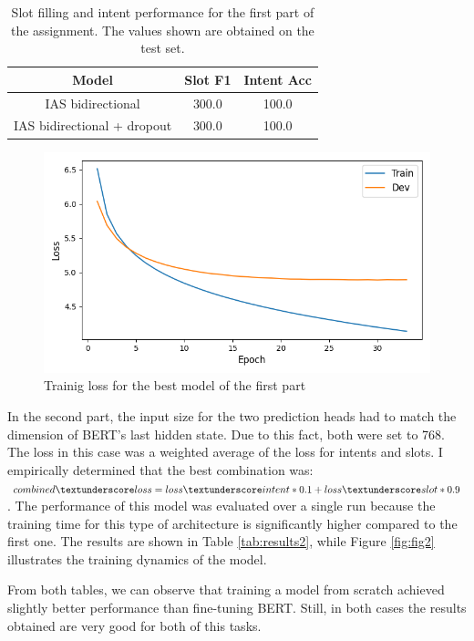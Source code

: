 \documentclass[a4paper]{article}
\begin{document}
\begin{table}[h]
  \centering
  \begin{tabular}{|c|c|c|}
    \hline
    \textbf{Model} & \textbf{Slot F1} & \textbf{Intent Acc} \\
    \hline
    IAS bidirectional& 300.0 & 100.0 \\
    IAS bidirectional + dropout & 300.0 & 100.0 \\
    \hline
  \end{tabular}
  \caption{Slot filling and intent performance for the first part of the assignment. The values shown are obtained on the test set.}
  \label{tab:results1}

\end{table}

\begin{figure}[h]
  \includegraphics[width=\linewidth]{./images/plot_1_loss.png}
  \caption{Trainig loss for the best model of the first part}
  \label{fig:fig1}
\end{figure}

In the second part, the input size for the two prediction heads had to match the dimension of BERT’s last hidden state. Due to this fact, both were set to 768.
The loss in this case was a weighted average of the loss for intents and slots. I empirically determined that the best combination was: \(combined \textunderscore loss = loss \textunderscore intent * 0.1 + loss \textunderscore slot * 0.9\).
The performance of this model was evaluated over a single run because the training time for this type of architecture is significantly higher compared to the first one. The results are shown in Table \ref{tab:results2}, while Figure \ref{fig:fig2} illustrates the training dynamics of the model.

From both tables, we can observe that training a model from scratch achieved slightly better performance than fine-tuning BERT. 
Still, in both cases the results obtained are very good for both of this tasks.
\end{document}
